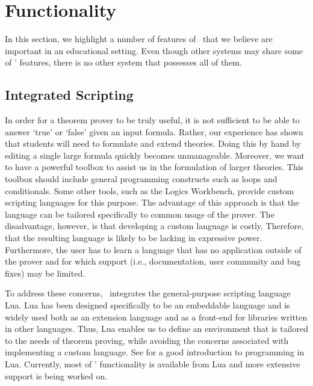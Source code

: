 \section{Functionality}
\label{sec:features}

In this section, we highlight a number of features of \oops\ that we believe
are important in an educational setting. Even though other systems may share
some of \oops' features, there is no other system that possesses all of them.

\subsection{Integrated Scripting}

In order for a theorem prover to be truly useful, it is not sufficient to be
able to answer `true' or `false' given an input formula. Rather, our
experience has shown that students will need to formulate and extend theories.
Doing this by hand by editing a single large formula quickly becomes
unmanageable.
Moreover, we want to have a powerful toolbox to assist us in the formulation
of larger theories.
This toolbox should include general programming constructs such as
loops and conditionals. Some other tools, such as the Logics Workbench, provide custom
scripting languages for this purpose. The advantage of this approach is that
the language can be tailored specifically to common usage of the prover. The
disadvantage, however, is that developing a custom language is costly.
Therefore, that the resulting language is likely to be lacking in expressive
power.
Furthermore, the user has to learn a language that has no application outside
of the prover and for which support (i.e., documentation, user community and
bug fixes) may be limited.

To address these concerns, \oops\ integrates the general-purpose scripting
language Lua.
Lua has been designed specifically to be an embeddable language and is widely
used both as an extension language and as a front-end for libraries written in
other languages.
Thus, Lua enables us to define an environment that is tailored to the needs of
theorem proving, while avoiding the concerns associated with implementing a
custom language.
See \citet{ierusalimschy2006} for a good introduction to programming in Lua.
Currently, most of \oops' functionality is available from Lua and more
extensive support is being worked on.

